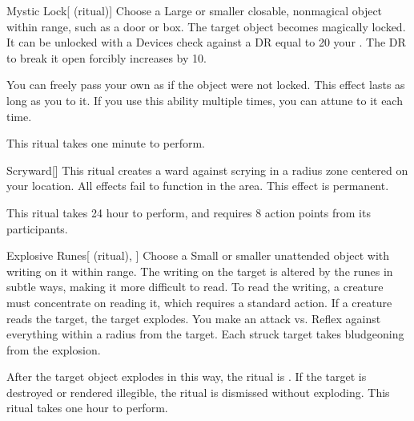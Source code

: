\begin{ability}[\nth{2}]{Mystic Lock}[ (ritual)]
Choose a Large or smaller closable, nonmagical object within \rngclose range, such as a door or box.
The target object becomes magically locked.
It can be unlocked with a Devices check against a DR equal to 20 \add your .
The DR to break it open forcibly increases by 10.

You can freely pass your own  as if the object were not locked.
This effect lasts as long as you  to it.
If you use this ability multiple times, you can attune to it each time.

This ritual takes one minute to perform.
\end{ability}
\vspace{0.25em}



\begin{ability}[\nth{2}]{Scryward}[]
This ritual creates a ward against scrying in a \arealarge radius zone centered on your location.
All  effects fail to function in the area.
This effect is permanent.

This ritual takes 24 hour to perform, and requires 8 action points from its participants.
\end{ability}
\vspace{0.25em}



\begin{ability}[\nth{3}]{Explosive Runes}[ (ritual), ]
Choose a Small or smaller unattended object with writing on it within \rngclose range.
The writing on the target is altered by the runes in subtle ways, making it more difficult to read.
To read the writing, a creature must concentrate on reading it, which requires a standard action.
If a creature reads the target, the target explodes.
You make an attack vs. Reflex against everything within a \areamed radius from the target.
Each struck target takes bludgeoning  from the explosion.

After the target object explodes in this way, the ritual is .
If the target is destroyed or rendered illegible, the ritual is dismissed without exploding.
This ritual takes one hour to perform.
\end{ability}
\vspace{0.25em}



